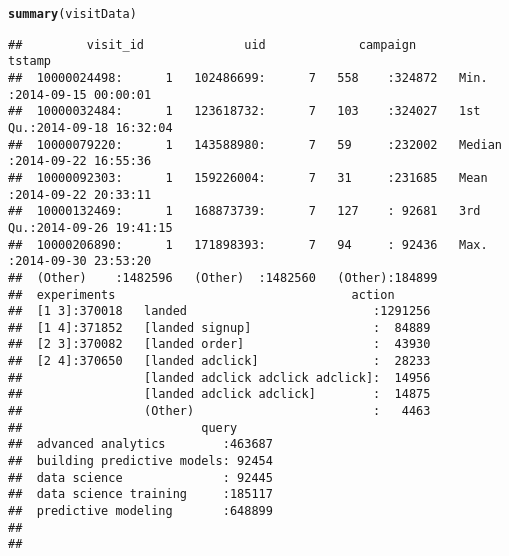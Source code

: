 \documentclass{article}\usepackage[]{graphicx}\usepackage[]{color}
\makeatletter
\newcommand{\hlstd}[1]{\textcolor[rgb]{0.345,0.345,0.345}{#1}}%
\newcommand{\hlkwd}[1]{\textcolor[rgb]{0.737,0.353,0.396}{\textbf{#1}}}%
\newenvironment{kframe}{%
 \def\at@end@of@kframe{}%
 \ifinner\ifhmode%
  \def\at@end@of@kframe{\end{minipage}}%
  \begin{minipage}{\columnwidth}%
 \fi\fi%
 \def\FrameCommand##1{\hskip\@totalleftmargin \hskip-\fboxsep
 \colorbox{shadecolor}{##1}\hskip-\fboxsep
     \hskip-\linewidth \hskip-\@totalleftmargin \hskip\columnwidth}%
 \MakeFramed {\advance\hsize-\width
   \@totalleftmargin\z@ \linewidth\hsize
   \@setminipage}}%
 {\par\unskip\endMakeFramed%
 \at@end@of@kframe}
\newenvironment{knitrout}{}{} %
\makeatother
\begin{document}
\begin{knitrout}
\color{fgcolor}\begin{kframe}
\begin{alltt}
\hlkwd{summary}\hlstd{(visitData)}
\end{alltt}
\begin{verbatim}
##         visit_id              uid             campaign          tstamp                   
##  10000024498:      1   102486699:      7   558    :324872   Min.   :2014-09-15 00:00:01  
##  10000032484:      1   123618732:      7   103    :324027   1st Qu.:2014-09-18 16:32:04  
##  10000079220:      1   143588980:      7   59     :232002   Median :2014-09-22 16:55:36  
##  10000092303:      1   159226004:      7   31     :231685   Mean   :2014-09-22 20:33:11  
##  10000132469:      1   168873739:      7   127    : 92681   3rd Qu.:2014-09-26 19:41:15  
##  10000206890:      1   171898393:      7   94     : 92436   Max.   :2014-09-30 23:53:20  
##  (Other)    :1482596   (Other)  :1482560   (Other):184899                                
##  experiments                                 action       
##  [1 3]:370018   landed                          :1291256  
##  [1 4]:371852   [landed signup]                 :  84889  
##  [2 3]:370082   [landed order]                  :  43930  
##  [2 4]:370650   [landed adclick]                :  28233  
##                 [landed adclick adclick adclick]:  14956  
##                 [landed adclick adclick]        :  14875  
##                 (Other)                         :   4463  
##                         query       
##  advanced analytics        :463687  
##  building predictive models: 92454  
##  data science              : 92445  
##  data science training     :185117  
##  predictive modeling       :648899  
##                                     
## 
\end{verbatim}
\end{kframe}
\end{knitrout}
\end{document}
